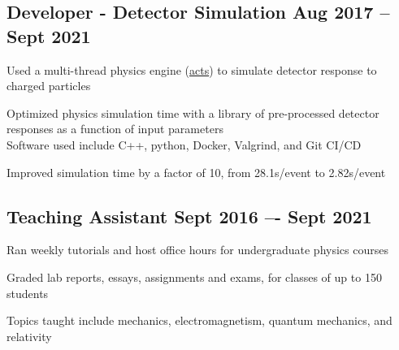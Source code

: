 \documentclass[letter,10pt]{article}
\begin{document}
\subsection{{Developer - Detector Simulation  \hfill Aug 2017 -- Sept 2021 }}
\begin{zitemize}
\item Used a multi-thread physics engine (\href{https://github.com/acts-project/acts/}{acts}) to simulate detector response to charged particles
\item Optimized physics simulation time with a library of pre-processed detector responses as a function of input parameters \\
Software used include C++, python, Docker, Valgrind, and Git CI/CD
\item Improved simulation time by a factor of 10, from 28.1s/event to 2.82s/event
\end{zitemize}


\subsection{{Teaching Assistant  \hfill Sept 2016 –- Sept 2021}}
\begin{zitemize}
\item Ran weekly tutorials and host office hours for undergraduate physics courses
\item Graded lab reports, essays, assignments and exams, for classes of up to 150 students
\item Topics taught include mechanics, electromagnetism, quantum mechanics, and relativity
\end{zitemize}
\end{document}
